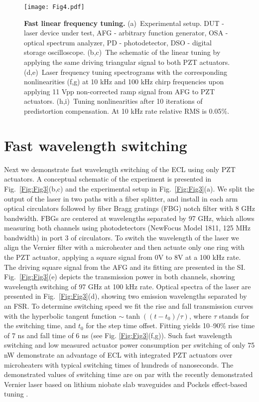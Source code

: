 \documentclass[9pt,twocolumn,twoside, superscriptaddress]{revtex4-2}
\begin{document}
\begin{figure*}[t]
	\centering
	\texttt{[image: Fig4.pdf]}
	\caption{
		\footnotesize \linespread{1}
		\textbf{Fast linear frequency tuning.}
		(a)~Experimental setup. DUT - laser device under test, AFG - arbitrary function generator, OSA - optical spectrum analyzer, PD - photodetector, DSO - digital storage oscilloscope.
		(b,c)~The schematic of the linear tuning by applying the same driving triangular signal to both PZT actuators.
		(d,e)~Laser frequency tuning spectrograms with the corresponding nonlinearities (f,g) at 10 kHz and 100 kHz chirp frequencies upon applying 11 Vpp non-corrected ramp signal from AFG to PZT actuators.
		(h,i)~Tuning nonlinearities after 10 iterations of predistortion compensation. At 10 kHz rate relative RMS is 0.05\%.  
	}
	\label{Fig:Fig4}
\end{figure*}

\section{Fast wavelength switching}
Next we demonstrate fast wavelength switching of the ECL using only PZT actuators.
A conceptual schematic of the experiment is presented in Fig.~\ref{Fig:Fig3}(b,c) and the experimental setup in Fig.~\ref{Fig:Fig3}(a).
We split the output of the laser in two paths with a fiber splitter, and install in each arm optical circulators followed by fiber Bragg gratings (FBG) notch filter with 8 GHz bandwidth.
FBGs are centered at wavelengths separated by 97 GHz, which allows measuring both channels using photodetectors (NewFocus Model 1811, 125 MHz bandwidth) in port 3 of circulators.
To switch the wavelength of the laser we align the Vernier filter with a microheater and then actuate only one ring with the PZT actuator, applying a square signal from 0V to 8V at a 100 kHz rate.
The driving square signal from the AFG and its fitting are presented in the SI.
Fig.~\ref{Fig:Fig3}(e) depicts the transmission power in both channels, showing wavelength switching of 97 GHz at 100 kHz rate.
Optical spectra of the laser are presented in Fig.~\ref{Fig:Fig3}(d), showing two emission wavelengths separated by an FSR.
To determine switching speed we fit the rise and fall transmission curves with the hyperbolic tangent function $\sim \tanh\left((t-t_0)/\tau\right)$, where $\tau$ stands for the switching time, and $t_0$ for the step time offset. Fitting yields 10–90\% rise time of 7 ns and fall time of 6 ns (see Fig. \ref{Fig:Fig3}(f,g)).
Such fast wavelength switching and low measured actuator power consumption per switching of only 75 nW demonstrate an advantage of ECL with integrated PZT actuators over microheaters with typical switching times of hundreds of nanoseconds.
The demonstrated values of switching time are on par with the recently demonstrated Vernier laser based on lithium niobate slab waveguides and Pockels effect-based tuning \cite{Li2022}.
\end{document}
